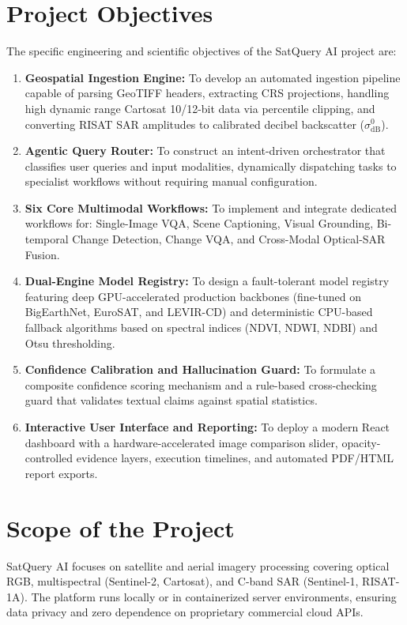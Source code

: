\documentclass[12pt,a4paper]{report}
\begin{document}
\section{Project Objectives}
The specific engineering and scientific objectives of the SatQuery AI project are:
\begin{enumerate}
    \item \textbf{Geospatial Ingestion Engine:} To develop an automated ingestion pipeline capable of parsing GeoTIFF headers, extracting CRS projections, handling high dynamic range Cartosat 10/12-bit data via percentile clipping, and converting RISAT SAR amplitudes to calibrated decibel backscatter ($\sigma^0_{\text{dB}}$).
    \item \textbf{Agentic Query Router:} To construct an intent-driven orchestrator that classifies user queries and input modalities, dynamically dispatching tasks to specialist workflows without requiring manual configuration.
    \item \textbf{Six Core Multimodal Workflows:} To implement and integrate dedicated workflows for: Single-Image VQA, Scene Captioning, Visual Grounding, Bi-temporal Change Detection, Change VQA, and Cross-Modal Optical-SAR Fusion.
    \item \textbf{Dual-Engine Model Registry:} To design a fault-tolerant model registry featuring deep GPU-accelerated production backbones (fine-tuned on BigEarthNet, EuroSAT, and LEVIR-CD) and deterministic CPU-based fallback algorithms based on spectral indices (NDVI, NDWI, NDBI) and Otsu thresholding.
    \item \textbf{Confidence Calibration and Hallucination Guard:} To formulate a composite confidence scoring mechanism and a rule-based cross-checking guard that validates textual claims against spatial statistics.
    \item \textbf{Interactive User Interface and Reporting:} To deploy a modern React dashboard with a hardware-accelerated image comparison slider, opacity-controlled evidence layers, execution timelines, and automated PDF/HTML report exports.
\end{enumerate}

\section{Scope of the Project}
SatQuery AI focuses on satellite and aerial imagery processing covering optical RGB, multispectral (Sentinel-2, Cartosat), and C-band SAR (Sentinel-1, RISAT-1A). The platform runs locally or in containerized server environments, ensuring data privacy and zero dependence on proprietary commercial cloud APIs.
\end{document}
